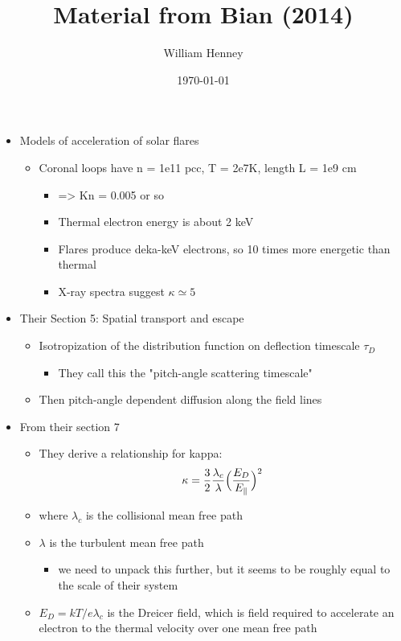 \documentclass[11pt]{article}
\author{William Henney}
\date{\today}
\title{Material from Bian (2014)}
\begin{document}
\maketitle
\tableofcontents

\begin{itemize}
\item Models of acceleration of solar flares
\begin{itemize}
\item Coronal loops have n = 1e11 pcc, T = 2e7K, length L = 1e9 cm
\begin{itemize}
\item => Kn = 0.005 or so
\item Thermal electron energy is about 2 keV
\item Flares produce deka-keV electrons, so 10 times more energetic than thermal
\item X-ray spectra suggest \(\kappa \simeq 5\)
\end{itemize}
\end{itemize}
\item Their Section 5: Spatial transport and escape
\begin{itemize}
\item Isotropization of the distribution function on deflection timescale \(\tau_{D}\)
\begin{itemize}
\item They call this the "pitch-angle scattering timescale"
\end{itemize}
\item Then pitch-angle dependent diffusion along the field lines
\end{itemize}
\item From their section 7
\begin{itemize}
\item They derive a relationship for kappa:
\[ \kappa = \frac{3}{2} \frac{\lambda_{c}}{\lambda} \Bigl(\frac{E_{D}}{E_{\parallel}}\Bigr)^{2} \]
\item where \(\lambda_{c}\) is the collisional mean free path
\item \(\lambda\) is the turbulent mean free path
\begin{itemize}
\item we need to unpack this further, but it seems to be roughly equal to the scale of their system
\end{itemize}
\item \(E_{D} = k T / e \lambda_{c}\) is the Dreicer field, which is field required to accelerate an electron to the thermal velocity over one mean free path

\end{itemize}
\end{itemize}
\end{document}
